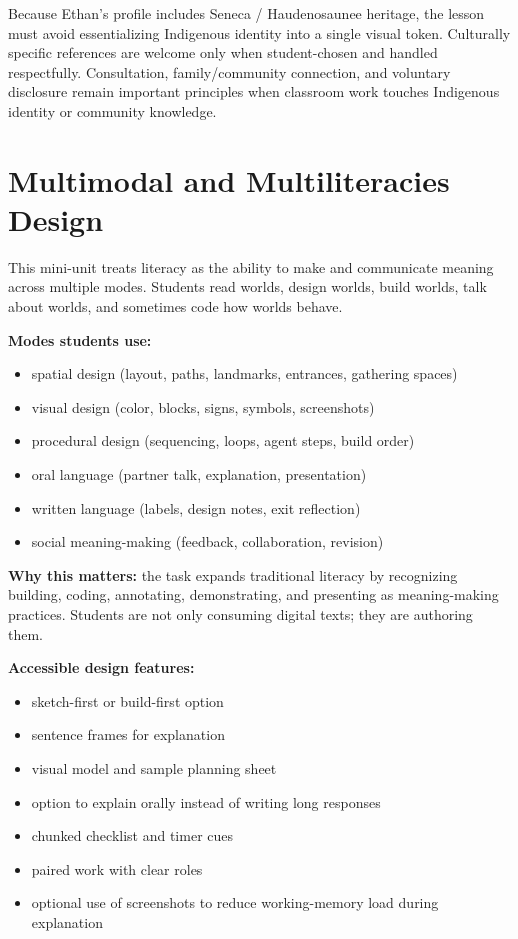 \documentclass[11pt]{article}
\begin{document}
Because Ethan's profile includes Seneca / Haudenosaunee heritage, the lesson must avoid essentializing Indigenous identity into a single visual token. Culturally specific references are welcome only when student-chosen and handled respectfully. Consultation, family/community connection, and voluntary disclosure remain important principles when classroom work touches Indigenous identity or community knowledge.

\section*{Multimodal and Multiliteracies Design}

This mini-unit treats literacy as the ability to make and communicate meaning across multiple modes. Students read worlds, design worlds, build worlds, talk about worlds, and sometimes code how worlds behave.

\textbf{Modes students use:}
\begin{itemize}[leftmargin=*]
    \item spatial design (layout, paths, landmarks, entrances, gathering spaces)
    \item visual design (color, blocks, signs, symbols, screenshots)
    \item procedural design (sequencing, loops, agent steps, build order)
    \item oral language (partner talk, explanation, presentation)
    \item written language (labels, design notes, exit reflection)
    \item social meaning-making (feedback, collaboration, revision)
\end{itemize}

\textbf{Why this matters:} the task expands traditional literacy by recognizing building, coding, annotating, demonstrating, and presenting as meaning-making practices. Students are not only consuming digital texts; they are authoring them.

\textbf{Accessible design features:}
\begin{itemize}[leftmargin=*]
    \item sketch-first or build-first option
    \item sentence frames for explanation
    \item visual model and sample planning sheet
    \item option to explain orally instead of writing long responses
    \item chunked checklist and timer cues
    \item paired work with clear roles
    \item optional use of screenshots to reduce working-memory load during explanation
\end{itemize}
\end{document}
